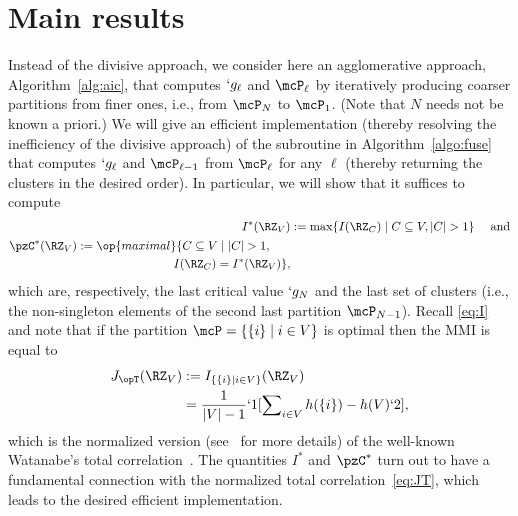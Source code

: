 \section{Main results}

Instead of the divisive approach, we consider here an agglomerative approach, 
Algorithm~\ref{alg:aic}, that computes $`g_{\ell}$ and $\mcP_{\ell}$ by iteratively producing coarser partitions from finer ones, i.e., from $\mcP_N$ to $\mcP_1$. 
(Note that $N$ needs not be known a priori.)
We will give an efficient implementation (thereby resolving the inefficiency of the divisive
approach) of the subroutine \Agglomerate in Algorithm~\ref{algo:fuse} that computes $`g_\ell$ and
$\mcP_{\ell-1}$ from $\mcP_{\ell}$ for any $\ell$ (thereby returning the clusters in the desired order).
In particular, we will show that it suffices to compute
\begin{subequations}
	\label{eq:IC*}
\begin{align}
	I^*(\RZ_V)&:=\max\{I(\RZ_{C})\mid C\subseteq V, \abs {C} > 1\} \kern1em \text{ and}\label{eq:I*}\\
	\begin{split}
	\pzC^*(\RZ_V)&:=\op{maximal}\{C\subseteq V \mid \abs{C} > 1, \\
	&\kern8em I(\RZ_C) = I^{*}(\RZ_{V})  \},
	\end{split}\label{eq:C*}
\end{align}
\end{subequations}
which are, respectively, the last critical value $`g_{N}$  \cite[Theorem~1]{chan16cluster} and the last set of clusters (i.e., the non-singleton elements of the second last
partition $\mcP_{N-1}$).
Recall 
\eqref{eq:I} 
and note that 
if the partition $\mcP=\Set {\Set {i}\mid i\in V}$ is
optimal
then the MMI is equal to
\begin{align}
	\label{eq:JT}
	\begin{split}
		J_{\opT}(\RZ_V)
		&:=I_{\Set{\Set{i}\mid i\in V}}(\RZ_V)\\
		&=\frac1 {\abs{V}-1}`1[\sum\nolimits_{i \in V}h(\Set{i})-h(V)`2],
	\end{split}
\end{align}
which is the normalized version (see~\cite{chan15mi} for more details) of
the well-known Watanabe's total correlation~\cite{watanabe60}.
The quantities $I^{*}$ and $\pzC^{*}$ turn out to have a fundamental connection
with the normalized total correlation~\eqref{eq:JT}, which leads to the desired efficient
implementation.


